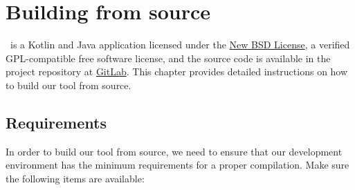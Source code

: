 \chapter{Building from source}
\label{chap:buildingfromsource}

\arara\ is a Kotlin and Java application licensed under the \href{http://www.opensource.org/licenses/bsd-license.php}{New BSD License}, a verified GPL-compatible free software license, and the source code is available in the project repository at \href{https://gitlab.com/islandoftex/arara}{GitLab}. This chapter provides detailed instructions on how to build our tool from source.

\section{Requirements}
\label{sec:requirements}

In order to build our tool from source, we need to ensure that our development environment has the minimum requirements for a proper compilation. Make sure the following items are available:

